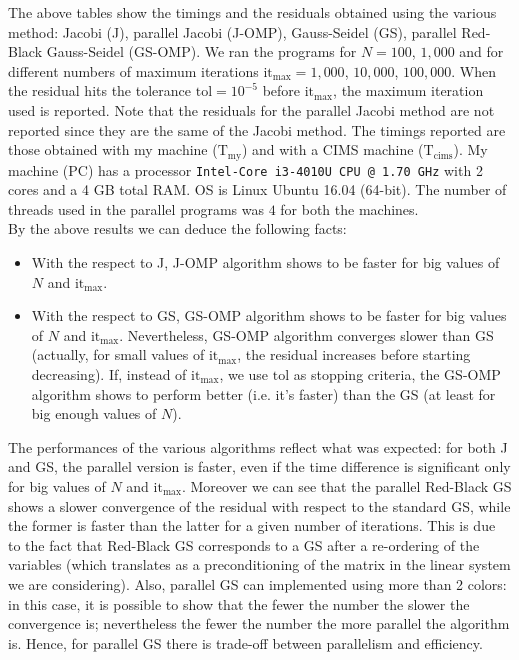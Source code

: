 \documentclass[a4paper,11pt]{article}
\theoremstyle{definition}
\theoremstyle{plain}
\theoremstyle{remark}
\begin{document}
The above tables show the timings and the residuals obtained using the various method: Jacobi (J), parallel Jacobi (J-OMP), Gauss-Seidel (GS), parallel Red-Black Gauss-Seidel (GS-OMP). We ran the programs for $N=100$, $1,000$ and for different numbers of maximum iterations $\text{it}_\text{max} = 1,000$, $10,000$, $100,000$. When the residual hits the tolerance $\mathrm{tol} = 10^{-5}$ before  $\text{it}_\text{max}$, the maximum iteration used is reported. Note that the residuals for the parallel Jacobi method are not reported since they are the same of the Jacobi method. The timings reported are those obtained with my machine ($\text{T}_\text{my}$) and with a CIMS machine ($\text{T}_\text{cims}$). My machine (PC) has a processor \texttt{Intel-Core i3-4010U CPU @ 1.70 GHz} with 2 cores and a 4 GB total RAM. OS is Linux Ubuntu 16.04 (64-bit). The number of threads used in the parallel programs was $4$ for both the machines. \\ 
By the above results we can deduce the following facts:
\begin{itemize}
\item With the respect to J, J-OMP algorithm shows to be faster for big values of $N$ and $\text{it}_\text{max}$.
\item With the respect to GS, GS-OMP algorithm shows to be faster for big values of $N$ and $\text{it}_\text{max}$. Nevertheless, GS-OMP algorithm converges slower than GS (actually, for small values of $\text{it}_\text{max}$, the residual increases before starting decreasing). If, instead of $\text{it}_\text{max}$, we use $\mathrm{tol}$ as stopping criteria, the GS-OMP algorithm shows to perform better (i.e. it's faster) than the GS (at least for big enough values of $N$).
\end{itemize}
The performances of the various algorithms reflect what was expected: for both J and GS, the parallel version is faster, even if the time difference is significant only for big values of $N$ and $\text{it}_\text{max}$. Moreover we can see that the parallel Red-Black GS shows a slower convergence of the residual with respect to the standard GS, while the former is faster than the latter for a given number of iterations. This is due to the fact that Red-Black GS corresponds to a GS after a re-ordering of the variables (which translates as a preconditioning of the matrix in the linear system we are considering). Also, parallel GS can implemented using more than 2 colors: in this case, it is possible to show that the fewer the number the slower the convergence is; nevertheless the fewer the number the more parallel the algorithm is. Hence, for parallel GS there is trade-off between parallelism and efficiency.
\end{document}

